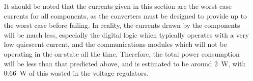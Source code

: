 It should be noted that the currents given in this section are the worst case currents for all components, as the converters must be designed to provide up to the worst case before failing. In reality, the currents drawn by the components will be much less, especially the digital logic which typically operates with a very low quiescent current, and the communications modules which will not be operating in the on-state all the time. Therefore, the total power consumption will be less than that predicted above, and is estimated to be around \SI{2}{\watt}, with \SI{0.66}{\watt} of this wasted in the voltage regulators.\\




